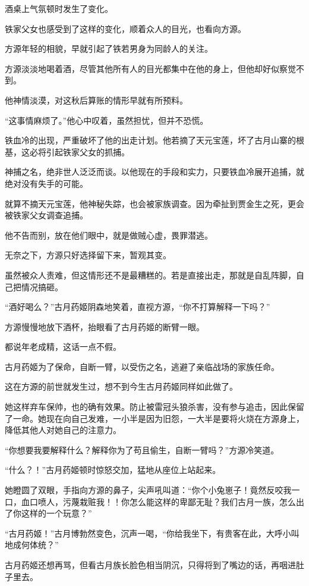 \begin{this_body}
酒桌上气氛顿时发生了变化。

铁家父女也感受到了这样的变化，顺着众人的目光，也看向方源。

方源年轻的相貌，早就引起了铁若男身为同龄人的关注。

方源淡淡地喝着酒，尽管其他所有人的目光都集中在他的身上，但他却好似察觉不到。

他神情淡漠，对这秋后算账的情形早就有所预料。

“这事情麻烦了。”他心中叹着，虽然担忧，但并不恐慌。

铁血冷的出现，严重破坏了他的出走计划。他若摘了天元宝莲，坏了古月山寨的根基，这必将引起铁家父女的抓捕。

神捕之名，绝非世人泛泛而谈。以他现在的手段和实力，只要铁血冷展开追捕，就绝对没有失手的可能。

就算不摘天元宝莲，他神秘失踪，也会被家族调查。因为牵扯到贾金生之死，更会被铁家父女调查追捕。

他不告而别，放在他们眼中，就是做贼心虚，畏罪潜逃。

无奈之下，方源只好选择留下来，暂观其变。

虽然被众人责难，但这情形还不是最糟糕的。若是直接出走，那就是自乱阵脚，自己把情况搞砸。

“酒好喝么？”古月药姬阴森地笑着，直视方源，“你不打算解释一下吗？”

方源慢慢地放下酒杯，抬眼看了古月药姬的断臂一眼。

都说年老成精，这话一点不假。

古月药姬为了保命，自断一臂，以受伤之名，逃避了亲临战场的家族任命。

这在方源的前世就发生过，想不到今生古月药姬同样如此做了。

她这样弃车保帅，也的确有效果。防止被雷冠头狼杀害，没有参与追击，因此保留了一命。她现在向自己发难，一小半是因为旧怨，一大半是要将火烧在方源身上，降低其他人对她自己的注意力。

“你想要我要解释什么？解释你为了苟且偷生，自断一臂吗？”方源冷笑道。

“什么？！”古月药姬顿时惊怒交加，猛地从座位上站起来。

她瞪圆了双眼，手指向方源的鼻子，尖声吼叫道：“你个小兔崽子！竟然反咬我一口，血口喷人，污蔑栽赃我！！你怎么能这样的卑鄙无耻？我们古月一族，怎么出了你这样的一个玩意？”

“古月药姬！”古月博勃然变色，沉声一喝，“你给我坐下，有贵客在此，大呼小叫地成何体统？”

古月药姬还想再骂，但看古月族长脸色相当阴沉，只得将到了嘴边的话，再咽进肚子里去。


\end{this_body}
